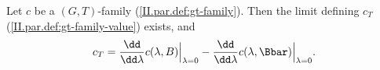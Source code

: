Let $c$ be a $(G,T)$-family (\cref{II.par.def:gt-family}). Then the limit defining $c_T$ (\cref{II.par.def:gt-family-value}) exists, and
\[
  c_T=\frac{\dd}{\dd\lambda}c(\lambda,B)\Big|_{\lambda=0}-\frac{\dd}{\dd\lambda}c(\lambda,\Bbar)\Big|_{\lambda=0}.
\]
